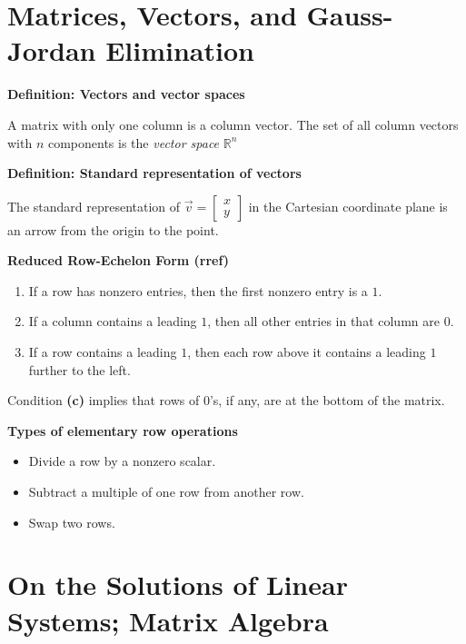 \documentclass{report}
\begin{document}
\section{Matrices, Vectors, and Gauss-Jordan Elimination}
\par\noindent\textbf{Definition: Vectors and vector spaces}
\par\noindent A matrix with only one column is a column vector. The set of all column vectors with $n$ components is the \textit{vector space} $\mathbb{R}^{n}$\\
\par\noindent\textbf{Definition: Standard representation of vectors}
\par\noindent The standard representation of $\vec{v}=\left[\begin{array}{c}x\\y\end{array}\right]$ in the Cartesian coordinate plane is an arrow from the origin to the point.\\
\par\noindent\textbf{Reduced Row-Echelon Form (rref)}
\renewcommand{\labelenumi}{\textbf{(\alph{enumi})}}
\begin{enumerate}
\item If a row has nonzero entries, then the first nonzero entry is a $1$.
\item If a column contains a leading $1$, then all other entries in that column are $0$.
\item If a row contains a leading $1$, then each row above it contains a leading $1$ further to the left.
\end{enumerate}
\par\noindent Condition \textbf{(c)} implies that rows of $0$'s, if any, are at the bottom of the matrix.\\
\par\noindent\textbf{Types of elementary row operations}
\begin{itemize}
\item Divide a row by a nonzero scalar.
\item Subtract a multiple of one row from another row.
\item Swap two rows.
\end{itemize}
\pagebreak

\section{On the Solutions of Linear Systems; Matrix Algebra}
\end{document}
